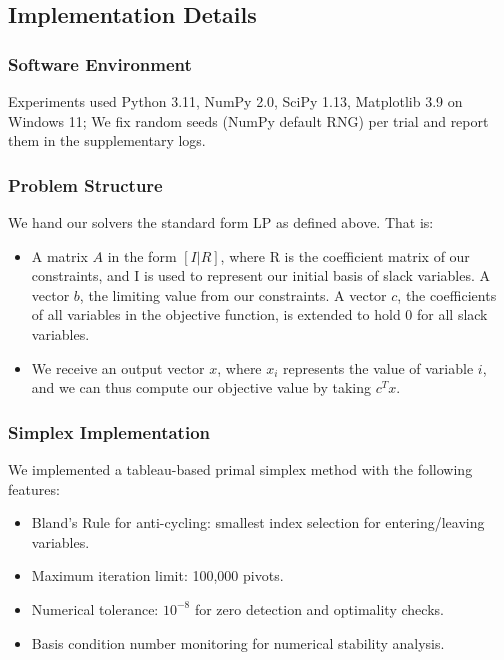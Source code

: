 \documentclass[11pt]{article}
\begin{document}
\subsection{Implementation Details}



\subsubsection{Software Environment}
Experiments used Python 3.11, NumPy 2.0, SciPy 1.13, Matplotlib 3.9 on Windows 11; We fix random seeds (NumPy default RNG) per trial and report them in the supplementary logs.

\subsubsection{Problem Structure}

We hand our solvers the standard form LP as defined above. That is:
\begin{itemize}
    \item A matrix \(A\) in the form \([I|R]\), where R is the coefficient matrix of our constraints, and I is used to represent our initial basis of slack variables. A vector \(b\), the limiting value from our constraints. A vector \(c\), the coefficients of all variables in the objective function, is extended to hold 0 for all slack variables.
    \item We receive an output vector \(x\), where \(x_i\) represents the value of variable \(i\), and we can thus compute our objective value by taking \(c^T x\).
\end{itemize}

\subsubsection{Simplex Implementation}
We implemented a tableau-based primal simplex method with the following features:
\begin{itemize}
    \item Bland's Rule for anti-cycling: smallest index selection for entering/leaving variables.
    \item Maximum iteration limit: 100,000 pivots.
    \item Numerical tolerance: \(10^{-8}\) for zero detection and optimality checks.
    \item Basis condition number monitoring for numerical stability analysis.
\end{itemize}
\end{document}
